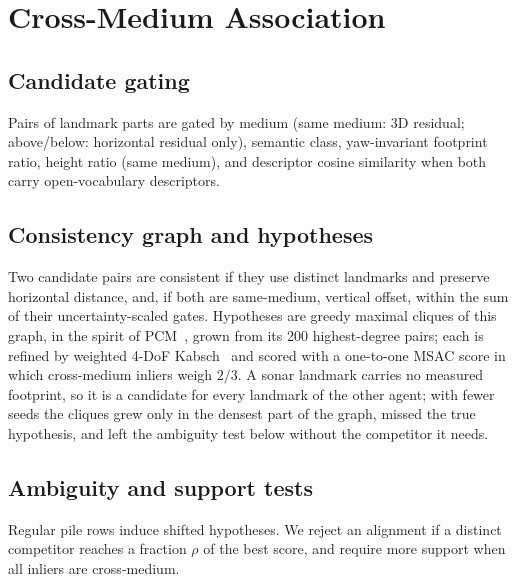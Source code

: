 \section{Cross-Medium Association}
\label{sec:association}


\subsection{Candidate gating}
Pairs of landmark parts are gated by medium (same medium: 3D residual; above/below: horizontal
residual only), semantic class, yaw-invariant footprint ratio, height ratio (same medium), and
descriptor cosine similarity when both carry open-vocabulary descriptors.

\subsection{Consistency graph and hypotheses}
Two candidate pairs are consistent if they use distinct landmarks and preserve horizontal
distance, and, if both are same-medium, vertical offset, within the sum of their uncertainty-scaled
gates. Hypotheses are greedy maximal cliques of this graph, in the spirit of
PCM~\cite{mangelson2018pcm}, grown from its 200 highest-degree pairs; each is refined by weighted
4-DoF Kabsch~\cite{umeyama1991} and scored with a one-to-one MSAC score in which cross-medium
inliers weigh $2/3$. A sonar landmark carries no measured footprint, so it is a candidate for every
landmark of the other agent; with fewer seeds the cliques grew only in the densest part of the
graph, missed the true hypothesis, and left the ambiguity test below without the competitor it
needs.

\subsection{Ambiguity and support tests}
Regular pile rows induce shifted hypotheses. We reject an alignment if a distinct competitor
reaches a fraction $\rho$ of the best score, and require more support when all inliers are
cross-medium.

